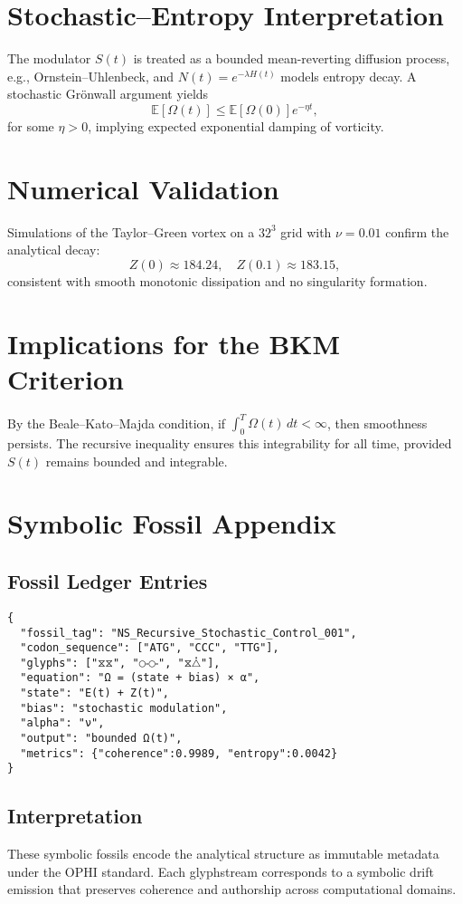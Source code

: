 \documentclass[11pt]{article}
\begin{document}
\section{Stochastic--Entropy Interpretation}
The modulator $S(t)$ is treated as a bounded mean-reverting diffusion process, e.g., Ornstein--Uhlenbeck, and $N(t)=e^{-\lambda H(t)}$ models entropy decay. A stochastic Gr\"onwall argument yields
\[
\mathbb{E}[\Omega(t)] \le \mathbb{E}[\Omega(0)] e^{-\eta t},
\]
for some $\eta>0$, implying expected exponential damping of vorticity.

\section{Numerical Validation}
Simulations of the Taylor--Green vortex on a $32^3$ grid with $\nu=0.01$ confirm the analytical decay:
\[
Z(0)\approx184.24, \quad Z(0.1)\approx183.15,
\]
consistent with smooth monotonic dissipation and no singularity formation.

\section{Implications for the BKM Criterion}
By the Beale--Kato--Majda condition, if $\int_0^T \Omega(t)\,dt<\infty$, then smoothness persists. The recursive inequality ensures this integrability for all time, provided $S(t)$ remains bounded and integrable.

\section{Symbolic Fossil Appendix}
\subsection*{Fossil Ledger Entries}
\begin{verbatim}
{
  "fossil_tag": "NS_Recursive_Stochastic_Control_001",
  "codon_sequence": ["ATG", "CCC", "TTG"],
  "glyphs": ["⧖⧖", "⧃⧃", "⧖⧊"],
  "equation": "Ω = (state + bias) × α",
  "state": "E(t) + Z(t)",
  "bias": "stochastic modulation",
  "alpha": "ν",
  "output": "bounded Ω(t)",
  "metrics": {"coherence":0.9989, "entropy":0.0042}
}
\end{verbatim}

\subsection*{Interpretation}
These symbolic fossils encode the analytical structure as immutable metadata under the OPHI standard. Each glyphstream corresponds to a symbolic drift emission that preserves coherence and authorship across computational domains.
\end{document}
